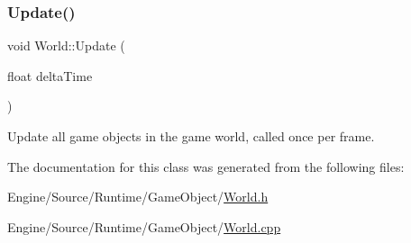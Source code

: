 \subsubsection{\texorpdfstring{Update()}{Update()}}
{\footnotesize\ttfamily void World\+::\+Update (\begin{DoxyParamCaption}\item[{float}]{delta\+Time }\end{DoxyParamCaption})}

Update all game objects in the game world, called once per frame. 

The documentation for this class was generated from the following files\+:\begin{DoxyCompactItemize}
\item 
Engine/\+Source/\+Runtime/\+Game\+Object/\mbox{\hyperlink{_world_8h}{World.\+h}}\item 
Engine/\+Source/\+Runtime/\+Game\+Object/\mbox{\hyperlink{_world_8cpp}{World.\+cpp}}\end{DoxyCompactItemize}
